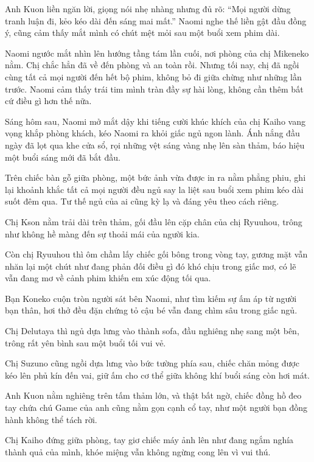 \documentclass[../main.tex]{subfiles}
\begin{document}
Anh Kuon liền ngăn lời, giọng nói nhẹ nhàng nhưng đủ rõ: ``Mọi người dừng tranh luận đi, kẻo kéo dài đến sáng mai mất.'' Naomi nghe thế liền gật đầu đồng ý, cũng cảm thấy mắt mình có chút mệt mỏi sau một buổi xem phim dài.

Naomi ngước mắt nhìn lên hướng tầng tám lần cuối, nơi phòng của chị Mikeneko nằm. Chị chắc hẳn đã về đến phòng và an toàn rồi. Nhưng tối nay, chị đã ngồi cùng tất cả mọi người đến hết bộ phim, không bỏ đi giữa chừng như những lần trước. Naomi cảm thấy trái tim mình tràn đầy sự hài lòng, không cần thêm bất cứ điều gì hơn thế nữa.

\omk

Sáng hôm sau, Naomi mở mắt dậy khi tiếng cười khúc khích của chị Kaiho vang vọng khắp phòng khách, kéo Naomi ra khỏi giấc ngủ ngon lành. Ánh nắng đầu ngày đã lọt qua khe cửa sổ, rọi những vệt sáng vàng nhẹ lên sàn thảm, báo hiệu một buổi sáng mới đã bắt đầu.

Trên chiếc bàn gỗ giữa phòng, một bức ảnh vừa được in ra nằm phẳng phiu, ghi lại khoảnh khắc tất cả mọi người đều ngủ say la liệt sau buổi xem phim kéo dài suốt đêm qua. Tư thế ngủ của ai cũng kỳ lạ và đáng yêu theo cách riêng.

Chị Kson nằm trải dài trên thảm, gối đầu lên cặp chân của chị Ryuuhou, trông như không hề màng đến sự thoải mái của người kia.

Còn chị Ryuuhou thì ôm chầm lấy chiếc gối bông trong vòng tay, gương mặt vẫn nhăn lại một chút như đang phản đối điều gì đó khó chịu trong giấc mơ, có lẽ vẫn đang mơ về cảnh phim khiến em xúc động tối qua.

Bạn Koneko cuộn tròn người sát bên Naomi, như tìm kiếm sự ấm áp từ người bạn thân, hơi thở đều đặn chứng tỏ cậu bé vẫn đang chìm sâu trong giấc ngủ.

Chị Delutaya thì ngủ dựa lưng vào thành sofa, đầu nghiêng nhẹ sang một bên, trông rất yên bình sau một buổi tối vui vẻ.

Chị Suzuno cũng ngồi dựa lưng vào bức tường phía sau, chiếc chăn mỏng được kéo lên phủ kín đến vai, giữ ấm cho cơ thể giữa không khí buổi sáng còn hơi mát.

Anh Kuon nằm nghiêng trên tấm thảm lớn, và thật bất ngờ, chiếc đồng hồ đeo tay chứa chú Game của anh cũng nằm gọn cạnh cổ tay, như một người bạn đồng hành không thể tách rời.

Chị Kaiho đứng giữa phòng, tay giơ chiếc máy ảnh lên như đang ngắm nghía thành quả của mình, khóe miệng vẫn không ngừng cong lên vì vui thú.
\end{document}
